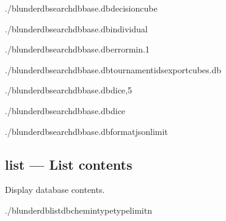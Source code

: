 \documentclass[letterpaper,10pt,english]{sphinxmanual}
\begin{document}
\sphinxAtStartPar
{}

\begin{sphinxVerbatim}[commandchars=\\\{\}]
./blunderdbsearch\PYGZhy{}\PYGZhy{}dbbase.db\PYGZhy{}\PYGZhy{}decisioncube

./blunderdbsearch\PYGZhy{}\PYGZhy{}dbbase.db\PYGZhy{}\PYGZhy{}individual

./blunderdbsearch\PYGZhy{}\PYGZhy{}dbbase.db\PYGZhy{}\PYGZhy{}error\PYGZhy{}min.1

./blunderdbsearch\PYGZhy{}\PYGZhy{}dbbase.db\PYGZhy{}\PYGZhy{}tournament\PYGZhy{}ids\PYGZhy{}\PYGZhy{}exportcubes.db

./blunderdbsearch\PYGZhy{}\PYGZhy{}dbbase.db\PYGZhy{}\PYGZhy{}dice,5

./blunderdbsearch\PYGZhy{}\PYGZhy{}dbbase.db\PYGZhy{}\PYGZhy{}dice

./blunderdbsearch\PYGZhy{}\PYGZhy{}dbbase.db\PYGZhy{}\PYGZhy{}formatjson\PYGZhy{}\PYGZhy{}limit
\end{sphinxVerbatim}


\subsection{list — List contents}
\label{\detokenize{cli:list-lister-le-contenu}}
\sphinxAtStartPar
Display database contents.

\begin{sphinxVerbatim}[commandchars=\\\{\}]
./blunderdblist\PYGZhy{}\PYGZhy{}db\PYGZlt{}chemin\PYGZgt{}\PYGZhy{}\PYGZhy{}type\PYGZlt{}type\PYGZgt{}\PYG{o}{[}\PYGZhy{}\PYGZhy{}limit\PYGZlt{}n\PYGZgt{}\PYG{o}{]}
\end{sphinxVerbatim}
\end{document}
